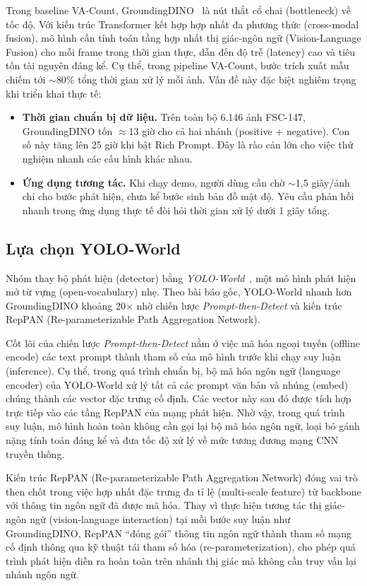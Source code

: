 \documentclass[a4paper,12pt]{report}
\numberwithin{figure}{chapter}
\numberwithin{table}{chapter}
\begin{document}
Trong baseline VA-Count, GroundingDINO~\cite{groundingdino} là nút thắt cổ chai (bottleneck) về tốc độ. Với kiến trúc Transformer kết hợp hợp nhất đa phương thức (cross-modal fusion), mô hình cần tính toán tầng hợp nhất thị giác-ngôn ngữ (Vision-Language Fusion) cho mỗi frame trong thời gian thực, dẫn đến độ trễ (latency) cao và tiêu tốn tài nguyên đáng kể. Cụ thể, trong pipeline VA-Count, bước trích xuất mẫu chiếm tới $\sim$80\% tổng thời gian xử lý mỗi ảnh.
Vấn đề này đặc biệt nghiêm trọng khi triển khai thực tế:
\begin{itemize}
    \item \textbf{Thời gian chuẩn bị dữ liệu.} Trên toàn bộ 6.146 ảnh FSC-147, GroundingDINO tốn $\approx$13 giờ cho cả hai nhánh (positive + negative). Con số này tăng lên 25 giờ khi bật Rich Prompt. Đây là rào cản lớn cho việc thử nghiệm nhanh các cấu hình khác nhau.
    \item \textbf{Ứng dụng tương tác.} Khi chạy demo, người dùng cần chờ $\sim$1,5 giây/ảnh chỉ cho bước phát hiện, chưa kể bước sinh bản đồ mật độ. Yêu cầu phản hồi nhanh trong ứng dụng thực tế đòi hỏi thời gian xử lý dưới 1 giây tổng.
\end{itemize}

\subsection{Lựa chọn YOLO-World}

Nhóm thay bộ phát hiện (detector) bằng \emph{YOLO-World}~\cite{yoloworld}, một mô hình phát hiện mở từ vựng (open-vocabulary) nhẹ. Theo bài báo gốc, YOLO-World nhanh hơn GroundingDINO khoảng 20$\times$ nhờ chiến lược \textit{Prompt-then-Detect} và kiến trúc RepPAN (Re-parameterizable Path Aggregation Network).

Cốt lõi của chiến lược \textit{Prompt-then-Detect} nằm ở việc mã hóa ngoại tuyến (offline encode) các text prompt thành tham số của mô hình trước khi chạy suy luận (inference). Cụ thể, trong quá trình chuẩn bị, bộ mã hóa ngôn ngữ (language encoder) của YOLO-World xử lý tất cả các prompt văn bản và nhúng (embed) chúng thành các vector đặc trưng cố định. Các vector này sau đó được tích hợp trực tiếp vào các tầng RepPAN của mạng phát hiện. Nhờ vậy, trong quá trình suy luận, mô hình hoàn toàn không cần gọi lại bộ mã hóa ngôn ngữ, loại bỏ gánh nặng tính toán đáng kể và đưa tốc độ xử lý về mức tương đương mạng CNN truyền thống.

Kiến trúc RepPAN (Re-parameterizable Path Aggregation Network) đóng vai trò then chốt trong việc hợp nhất đặc trưng đa tỉ lệ (multi-scale feature) từ backbone với thông tin ngôn ngữ đã được mã hóa. Thay vì thực hiện tương tác thị giác-ngôn ngữ (vision-language interaction) tại mỗi bước suy luận như GroundingDINO, RepPAN ``đóng gói'' thông tin ngôn ngữ thành tham số mạng cố định thông qua kỹ thuật tái tham số hóa (re-parameterization), cho phép quá trình phát hiện diễn ra hoàn toàn trên nhánh thị giác mà không cần truy vấn lại nhánh ngôn ngữ.
\end{document}

